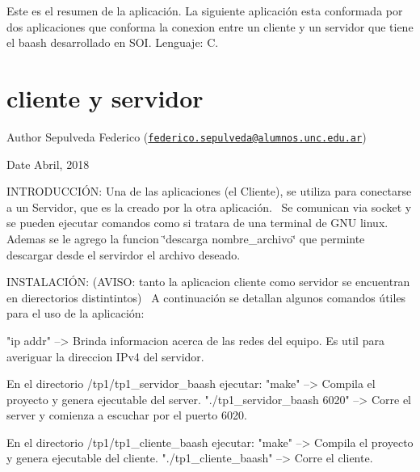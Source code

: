 Este es el resumen de la aplicación. La siguiente aplicación esta conformada por dos aplicaciones que conforma la conexion entre un cliente y un servidor que tiene el baash desarrollado en S\+OI. Lenguaje\+: C.\section*{cliente y servidor }

\begin{DoxyAuthor}{Author}
Sepulveda Federico (\href{mailto:federico.sepulveda@alumnos.unc.edu.ar}{\tt federico.\+sepulveda@alumnos.\+unc.\+edu.\+ar}) 
\end{DoxyAuthor}
\begin{DoxyDate}{Date}
Abril, 2018
\end{DoxyDate}
\begin{DoxyParagraph}{I\+N\+T\+R\+O\+D\+U\+C\+C\+IÓN\+:}
Una de las aplicaciones (el Cliente), se utiliza para conectarse a un Servidor, que es la creado por la otra aplicación.~\newline
Se comunican via socket y se pueden ejecutar comandos como si tratara de una terminal de G\+NU linux. Ademas se le agrego la funcion \char`\"{}descarga nombre\+\_\+archivo\char`\"{} que perminte descargar desde el servirdor el archivo deseado.
\end{DoxyParagraph}
\begin{DoxyParagraph}{I\+N\+S\+T\+A\+L\+A\+C\+IÓN\+:}
(A\+V\+I\+SO\+: tanto la aplicacion cliente como servidor se encuentran en dierectorios distintintos)~\newline
A continuación se detallan algunos comandos útiles para el uso de la aplicación\+:~\newline
\begin{DoxyVerb}"ip addr"                               --> Brinda informacion acerca de las redes del equipo. Es util para averiguar la 
                                            direccion IPv4 del servidor.

En el directorio /tp1/tp1_servidor_baash ejecutar:
"make"                                  --> Compila el proyecto y genera ejecutable del server.
"./tp1_servidor_baash 6020"             --> Corre el server y comienza a escuchar por el puerto 6020.

En el directorio /tp1/tp1_cliente_baash ejecutar:
"make"                                  --> Compila el proyecto y genera ejecutable del cliente.
"./tp1_cliente_baash"                   --> Corre el cliente.
\end{DoxyVerb}

\end{DoxyParagraph}
